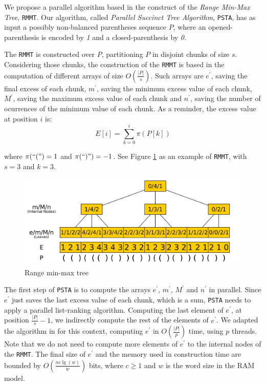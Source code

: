 We propose a parallel algorithm based in the construct of the \emph{Range Min-Max Tree}, {\tt RMMT}\cite{Navarro:2014:FFS:2620785.2601073}. Our algorithm, called \emph{Parallel Succinct Tree Algorithm}, {\tt PSTA}, has as input a possibly non-balanced parentheses sequence $P$, where an opened-parenthesis is encoded by \emph{1} and a closed-parenthesis by \emph{0}.

The {\tt RMMT} is constructed over $P$, partitioning $P$ in disjoint chunks of size $s$. Considering those chunks, the construction of the {\tt RMMT} is based in the computation of different arrays of size $O(\frac{|P|}{s})$. Such arrays are $e^{\prime}$, saving the final excess of each chunk, $m^{\prime}$, saving the minimum excess value of each chunk, $M^{\prime}$, saving the maximum excess value of each chunk and $n^{\prime}$, saving the number of ocurrences of the minimum value of each chunk. As a reminder, the excess value at position $i$ is:
\begin{equation}
		\displaystyle E[i] = \sum_{k=0}^{i} \pi(P[k])
		\label{eq:excess}
\end{equation}

where $\pi(``(") = 1$ and $\pi(``)") = -1$. See Figure \ref{fig:RangeMinMaxTree} as an example of {\tt RMMT}, with $s=3$ and $k=3$.

 	\begin{figure}[ht]
		\centering
		\includegraphics[scale=0.13]{./images/Range-min-max-tree.png}
     	\caption{Range min-max tree}
		\label{fig:RangeMinMaxTree} 
	\end{figure}

The first step of {\tt PSTA} is to compute the arrays $e^{\prime}$, $m^{\prime}$, $M^{\prime}$ and $n^{\prime}$ in parallel. Since $e^{\prime}$ just saves the last excess value of each chunk, which is a sum, {\tt PSTA} needs to apply a parallel list-ranking algorithm. Computing the last element of $e^{\prime}$, at position $\frac{|P|}{s}-1$, we indirectly compute the rest of the elements of $e^{\prime}$. We adapted the algorithm in \cite{Helman2001265} for this context, computing $e^{\prime}$ in $O(\frac{|P|}{p})$ time, using $p$ threads. Note that we do not need to compute more elements of $e^{\prime}$ to the internal nodes of the {\tt RMMT}. The final size of $e^{\prime}$  and the memory used in construction time are bounded by $O(\frac{nc\lg(w)}{w})$ bits, where $c\geqslant 1$ and $w$ is the word size in the RAM model.

